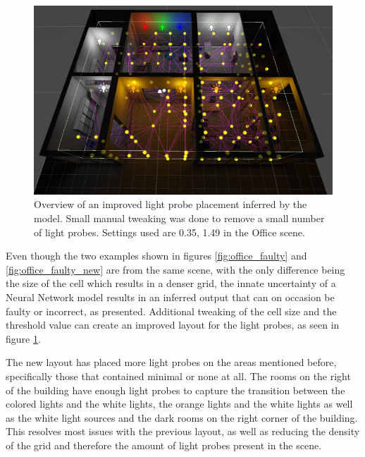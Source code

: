 \begin{figure}[h]
	\centering
	\includegraphics[width=\linewidth]{Graphics/results/office_0.35_1.49.jpg}
	\caption{Overview of an improved light probe placement inferred by the model. Small manual tweaking was done to remove a small number of light probes. Settings used are 0.35, 1.49 in the Office scene.}
	\label{fig:office_faulty_better}
\end{figure}

Even though the two examples shown in figures \ref{fig:office_faulty} and \ref{fig:office_faulty_new} are from the same scene, with the only difference being the size of the cell which results in a denser grid, the innate uncertainty of a Neural Network model results in an inferred output that can on occasion be faulty or incorrect, as presented. Additional tweaking of the cell size and the threshold value can create an improved layout for the light probes, as seen in figure \ref{fig:office_faulty_better}. 

The new layout has placed more light probes on the areas mentioned before, specifically those that contained minimal or none at all. The rooms on the right of the building have enough light probes to capture the transition between the colored lights and the white lights, the orange lights and the white lights as well as the white light sources and the dark rooms on the right corner of the building. This resolves most issues with the previous layout, as well as reducing the density of the grid and therefore the amount of light probes present in the scene.

